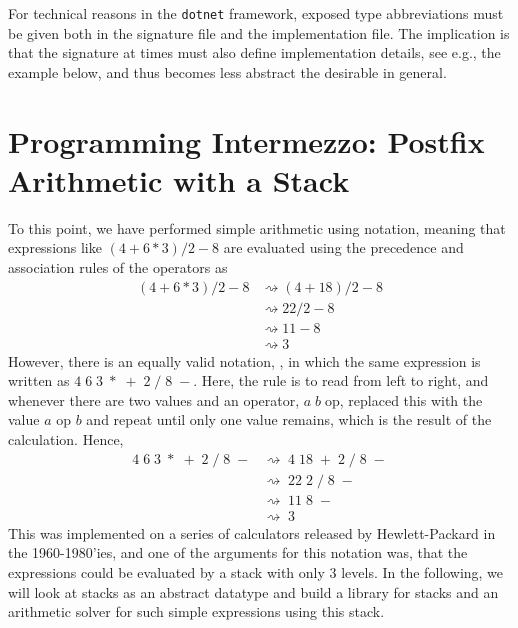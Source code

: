 \documentclass[fsharpNotes.tex]{subfiles}
\begin{document}
For technical reasons in the  \lstinline[language=console]{dotnet} framework, exposed type abbreviations must be given both in the signature file and the implementation file. The implication is that the signature at times must also define implementation details, see e.g., the example below, and thus becomes less abstract the desirable in general.

\section{Programming Intermezzo: Postfix Arithmetic with a Stack}
To this point, we have performed simple arithmetic using  notation, meaning that expressions like $(4+6*3)/2-8$ are evaluated using the precedence and association rules of the operators as
\begin{align}
  (4+6*3)/2-8
  &\rightsquigarrow (4+18)/2-8\\
  &\rightsquigarrow 22/2-8\\
  &\rightsquigarrow 11-8\\
  &\rightsquigarrow 3
\end{align}
However, there is an equally valid notation, , in which the same expression is written as $4\; 6\; 3\; *\; +\; 2\; /\; 8\; -$. Here, the rule is to read from left to right, and whenever there are two values and an operator, $a\; b\; \text{op}$, replaced this with the value $a \text{ op } b$ and repeat until only one value remains, which is the result of the calculation. Hence,
\begin{align}
  4\; 6\; 3\; *\; +\; 2\; /\; 8\; -
  &\rightsquigarrow\; 4\; 18\; +\; 2\; /\; 8\; -\\
  &\rightsquigarrow\; 22\; 2\; /\; 8\; -\\
  &\rightsquigarrow\; 11\; 8\; -\\
  &\rightsquigarrow\; 3
\end{align}
This was implemented on a series of calculators released by Hewlett-Packard in the 1960-1980'ies, and one of the arguments for this notation was, that the expressions could be evaluated by a stack with only 3 levels. In the following, we will look at stacks as an abstract datatype and build a library for stacks and an arithmetic solver for such simple expressions using this stack.
\end{document}
